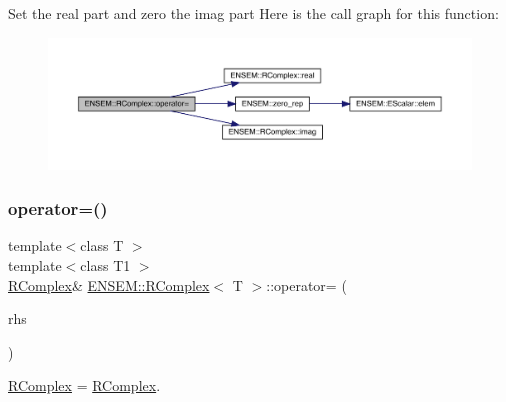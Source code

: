 Set the real part and zero the imag part Here is the call graph for this function\+:
\nopagebreak
\begin{figure}[H]
\begin{center}
\leavevmode
\includegraphics[width=350pt]{d9/d0e/classENSEM_1_1RComplex_a6553ee6381e82a410c0c531fde8e3fee_cgraph}
\end{center}
\end{figure}
\mbox{\label{classENSEM_1_1RComplex_a14a5d3857ebb326ed5f211cc30da3ced}} 
\subsubsection{\texorpdfstring{operator=()}{operator=()}\hspace{0.1cm}{\footnotesize\ttfamily [3/4]}}
{\footnotesize\ttfamily template$<$class T $>$ \\
template$<$class T1 $>$ \\
\mbox{\hyperlink{classENSEM_1_1RComplex}{R\+Complex}}\& \mbox{\hyperlink{classENSEM_1_1RComplex}{E\+N\+S\+E\+M\+::\+R\+Complex}}$<$ T $>$\+::operator= (\begin{DoxyParamCaption}\item[{const \mbox{\hyperlink{classENSEM_1_1RComplex}{R\+Complex}}$<$ T1 $>$ \&}]{rhs }\end{DoxyParamCaption})\hspace{0.3cm}{\ttfamily [inline]}}



\mbox{\hyperlink{classENSEM_1_1RComplex}{R\+Complex}} = \mbox{\hyperlink{classENSEM_1_1RComplex}{R\+Complex}}. 

